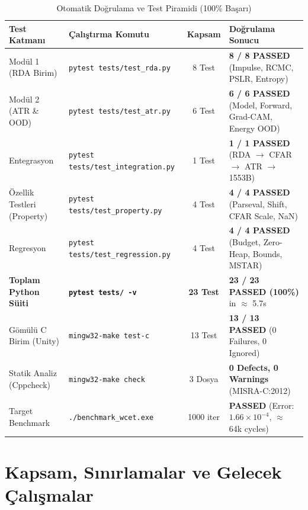 \documentclass[11pt,a4paper]{article}
\begin{document}
\begin{table}[H]
\centering
\small
\caption{Otomatik Doğrulama ve Test Piramidi (100\% Başarı)}
\label{tab:final_verification_matrix}
\begin{tabularx}{\textwidth}{llcX}
\toprule
\textbf{Test Katmanı} & \textbf{Çalıştırma Komutu} & \textbf{Kapsam} & \textbf{Doğrulama Sonucu} \\
\midrule
Modül 1 (RDA Birim) & \texttt{pytest tests/test\_rda.py} & 8 Test & \textcolor{successgreen}{\textbf{8 / 8 PASSED}} (Impulse, RCMC, PSLR, Entropy) \\
Modül 2 (ATR \& OOD) & \texttt{pytest tests/test\_atr.py} & 6 Test & \textcolor{successgreen}{\textbf{6 / 6 PASSED}} (Model, Forward, Grad-CAM, Energy OOD) \\
Entegrasyon & \texttt{pytest tests/test\_integration.py} & 1 Test & \textcolor{successgreen}{\textbf{1 / 1 PASSED}} (RDA $\to$ CFAR $\to$ ATR $\to$ 1553B) \\
Özellik Testleri (Property) & \texttt{pytest tests/test\_property.py} & 4 Test & \textcolor{successgreen}{\textbf{4 / 4 PASSED}} (Parseval, Shift, CFAR Scale, NaN) \\
Regresyon & \texttt{pytest tests/test\_regression.py} & 4 Test & \textcolor{successgreen}{\textbf{4 / 4 PASSED}} (Budget, Zero-Heap, Bounds, MSTAR) \\
\textbf{Toplam Python Süiti} & \textbf{\texttt{pytest tests/ -v}} & \textbf{23 Test} & \textcolor{successgreen}{\textbf{23 / 23 PASSED (100\%)}} in $\approx$ 5.7s \\
\midrule
Gömülü C Birim (Unity) & \texttt{mingw32-make test-c} & 13 Test & \textcolor{successgreen}{\textbf{13 / 13 PASSED}} (0 Failures, 0 Ignored) \\
Statik Analiz (Cppcheck) & \texttt{mingw32-make check} & 3 Dosya & \textcolor{successgreen}{\textbf{0 Defects, 0 Warnings}} (MISRA-C:2012) \\
Target Benchmark & \texttt{./benchmark\_wcet.exe} & 1000 iter & \textcolor{successgreen}{\textbf{PASSED}} (Error: $1.66\times 10^{-4}$, $\approx$ 64k cycles) \\
\bottomrule
\end{tabularx}
\end{table}

\section{Kapsam, Sınırlamalar ve Gelecek Çalışmalar}
\end{document}
